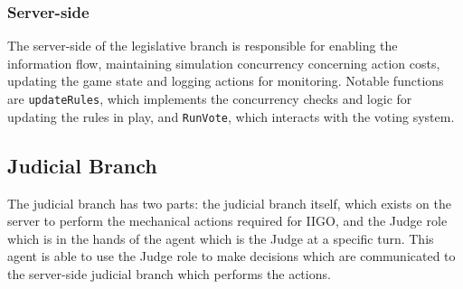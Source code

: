 \subsubsection{Server-side}
The server-side of the legislative branch is responsible for enabling the information flow, maintaining simulation concurrency concerning action costs, updating the game state and logging actions for monitoring. Notable functions are \texttt{updateRules}, which implements the concurrency checks and logic for updating the rules in play, and \texttt{RunVote}, which interacts with the voting system.

\subsection{Judicial Branch}
The judicial branch has two parts: the judicial branch itself, which exists on the server to perform the mechanical actions required for IIGO, and the Judge role which is in the hands of the agent which is the Judge at a specific turn. This agent is able to use the Judge role to make decisions which are communicated to the server-side judicial branch which performs the actions.
